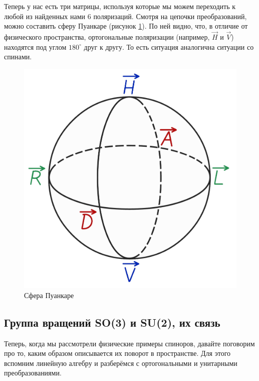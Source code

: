 Теперь у нас есть три матрицы, используя которые мы можем переходить к любой из найденных нами 6 поляризаций. Смотря на цепочки преобразований, можно составить сферу Пуанкаре (рисунок \ref{fig B.6}). По ней видно, что, в отличие от физического пространства, ортогональные поляризации (например, $\Vec{H}$ и $\Vec{V}$) находятся под углом $180^{\circ}$ друг к другу. То есть ситуация аналогична ситуации со спинами.
\begin{figure}[!ht]
\centering
\includegraphics[scale=0.23]{appendix/images/Poincare sphere.png}
\caption{Сфера Пуанкаре}
\label{fig B.6}
\end{figure}

\subsection{Группа вращений SO(3) и SU(2), их связь}
Теперь, когда мы рассмотрели физические примеры спиноров, давайте поговорим про то, каким образом описывается их поворот в пространстве. Для этого вспомним линейную алгебру и разберёмся с ортогональными и унитарными преобразованиями.

